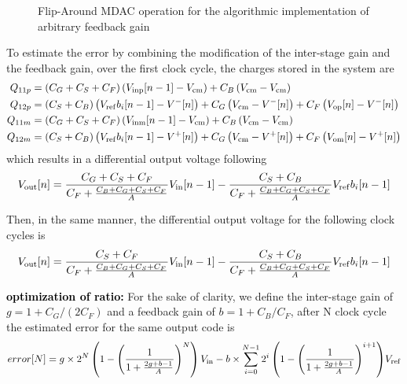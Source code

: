 \begin{figure}[htp]
\begin{subfigure}[b]{0.45\textwidth}
		\label{fig:algo-mdac-phi2}
	\end{subfigure}
	\caption{Flip-Around MDAC operation for the algorithmic implementation of arbitrary feedback gain}
	\label{fig:algo-mdac-cb}
\end{figure}

To estimate the error by combining the modification of the inter-stage gain and the feedback gain, over the first clock cycle, the charges stored in the system are
\begin{align}
Q_{11p} &= \left(C_G+C_S+C_F \right) \left( V_{\rm inp}[n-1] - V_{\rm cm} \right) + C_B \left(V_{\rm cm}-V_{\rm cm} \right) \\
Q_{12p} &= \left(C_S+C_B \right) \left( V_{\rm ref}b_i[n-1] - V^{-}[n] \right) + C_G \left(V_{\rm cm}-V^{-}[n] \right)  + C_F \left(V_{\rm op}[n]-V^{-}[n] \right) \\
Q_{11m} &= \left(C_G+C_S+C_F \right) \left( V_{\rm inm}[n-1] - V_{\rm cm} \right) + C_B \left(V_{\rm cm}-V_{\rm cm} \right) \\
Q_{12m} &= \left(C_S+C_B \right) \left( V_{\rm ref}b_i[n-1] - V^{+}[n] \right) + C_G \left(V_{\rm cm}-V^{+}[n] \right)  + C_F \left(V_{\rm om}[n]-V^{+}[n] \right) 
\end{align}
which results in a differential output voltage following 
\begin{equation}
	V_{\rm out}[n] = \frac{C_G+C_S+C_F}{C_F+\frac{C_B+C_G+C_S+C_F}{A}} V_{\rm in}[n-1] - \frac{C_S+C_B}{C_F+\frac{C_B+C_G+C_S+C_F}{A}} V_{\rm ref}b_i[n-1]
\end{equation}

Then, in the same manner, the differential output voltage for the following clock cycles is
\begin{equation}
	V_{\rm out}[n] = \frac{C_S+C_F}{C_F+\frac{C_B+C_G+C_S+C_F}{A}} V_{\rm in}[n-1] - \frac{C_S+C_B}{C_F+\frac{C_B+C_G+C_S+C_F}{A}} V_{\rm ref}b_i[n-1]
\end{equation}

\textbf{\textcolor{black}{optimization of ratio:}}
For the sake of clarity, we define the inter-stage gain of \(g = 1+C_G/(2C_F)\) and a feedback gain of \(b = 1+C_B/C_F\), after N clock cycle the estimated error for the same output code is
\begin{equation}
	error[N] = g \times 2^N \left(1-{\left(\frac{1}{1+\frac{2g+b-1}{A}} \right)}^N \right) V_{\rm in} - b \times \sum_{i=0}^{N-1}{2^i\left(1-{\left(\frac{1}{1+\frac{2g+b-1}{A}} \right)}^{i+1} \right)} V_{\rm ref}
\end{equation}

